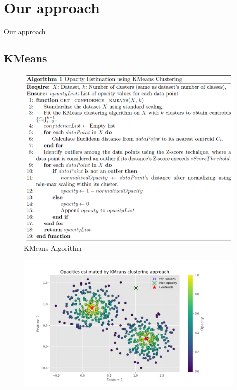 \documentclass[aspectratio=169]{beamer}
\begin{document}
\section{Our approach}
\begin{frame}
    \begin{center}
        \Huge Our approach
    \end{center}
\end{frame}

\subsection{KMeans}
\begin{frame}
\begin{figure}
    \centering
    \includegraphics[width=0.68\linewidth]{../../fig/alg_kmeans_opacity.png}
    \caption{KMeans Algorithm}
    \label{fig:alg_kmeans}
\end{figure}
\end{frame}

\begin{frame}
\begin{figure}
    \centering
    \includegraphics[width=0.78\linewidth]{../../fig/kmeans_opactiy.png}
    \label{fig:kmeans_opacity}
\end{figure}
\end{frame}
\end{document}
